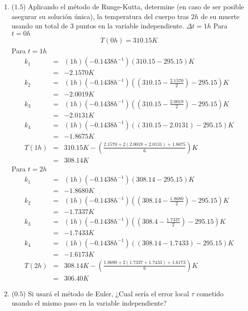 \documentclass[12pt]{article}
\begin{document}
\begin{enumerate}[leftmargin=*,widest=9]
\begin{enumerate}[label=\alph*]
    \item (\(1.5\)) Aplicando el método de Runge-Kutta, determine (en caso de ser posible asegurar su solución única), la temperatura del cuerpo tras \(2h\) de su muerte usando un total de 3 puntos en la variable independiente.
    $\Delta t = 1h$
    Para $ t =  0h$
    \begin{eqnarray*}
    T(0h) =  310.15K
	\end{eqnarray*}
    Para $ t = 1 h$
    \begin{eqnarray*}
    k_1 &=& (1h)(-0.1438 h^{-1})(310.15-295.15)K \\ &=& -2.1570K \\ k_2 &=& (1h)(-0.1438 h^{-1})\left(\left(310.15- \frac{2.1570}{2} \right) - 295.15 \right) K \\ &=& -2.0019K \\  k_3 &=& (1h)(-0.1438 h^{-1})\left(\left(310.15- \frac{2.0019}{2} \right) - 295.15 \right) K \\ &=& -2.0131K \\  k_4 &=& (1h)(-0.1438 h^{-1})((310.15- 2.0131)-295.15)K \\ &=& -1.8675K \\ T(1h) &=& 310.15 K - \left( \frac{2.1570 + 2(2.0019+2.0131)+1.8675}{6}\right)K \\ &=& 308.14K
    \end{eqnarray*}
    Para $t = 2h$
    \begin{eqnarray*}
    k_1 &=& (1h)(-0.1438 h^{-1})(308.14-295.15)K \\ &=& -1.8680K \\ k_2 &=& (1h)(-0.1438 h^{-1})\left(\left(308.14- \frac{1.8680}{2} \right) - 295.15 \right) K \\ &=& -1.7337K \\  k_3 &=& (1h)(-0.1438 h^{-1})\left(\left(308.4- \frac{1.7337}{2} \right) - 295.15 \right) K \\ &=& -1.7433K \\  k_4 &=& (1h)(-0.1438 h^{-1})((308.14- 1.7433)-295.15)K \\ &=& -1.6173K \\ T(2h) &=& 308.14 K - \left( \frac{1.8680 + 2(1.7337+1.7433)+1.6173}{6}\right)K \\ &=& 306.40K
    \end{eqnarray*}
    \item (\(0.5\)) Si usará el método de Euler, ¿Cual sería el error local \(\tau \) cometido usando el mismo paso en la variable independiente?
   \begin{eqnarray*}

\end{eqnarray*}
\end{enumerate}
\end{enumerate}
\end{document}
